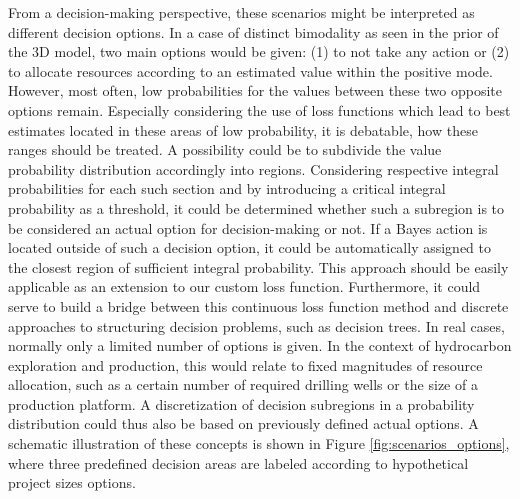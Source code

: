 	From a decision-making perspective, these scenarios might be interpreted as different decision options. In a case of distinct bimodality as seen in the prior of the 3D model, two main options would be given: (1) to not take any action or (2) to allocate resources according to an estimated value within the positive mode. However, most often, low probabilities for the values between these two opposite options remain. Especially considering the use of loss functions which lead to best estimates located in these areas of low probability, it is debatable, how these ranges should be treated. A possibility could be to subdivide the value probability distribution accordingly into regions. Considering respective integral probabilities for each such section and by introducing a critical integral probability as a threshold, it could be determined whether such a subregion is to be considered an actual option for decision-making or not. If a Bayes action is located outside of such a decision option, it could be automatically assigned to the closest region of sufficient integral probability. This approach should be easily applicable as an extension to our custom loss function. Furthermore, it could serve to build a bridge between this continuous loss function method and discrete approaches to structuring decision problems, such as decision trees. In real cases, normally only a limited number of options is given. In the context of hydrocarbon exploration and production, this would relate to fixed magnitudes of resource allocation, such as a certain number of required drilling wells or the size of a production platform. A discretization of decision subregions in a probability distribution could thus also be based on previously defined actual options. A schematic illustration of these concepts is shown in Figure \ref{fig:scenarios_options}, where three predefined decision areas are labeled according to hypothetical project sizes options.
